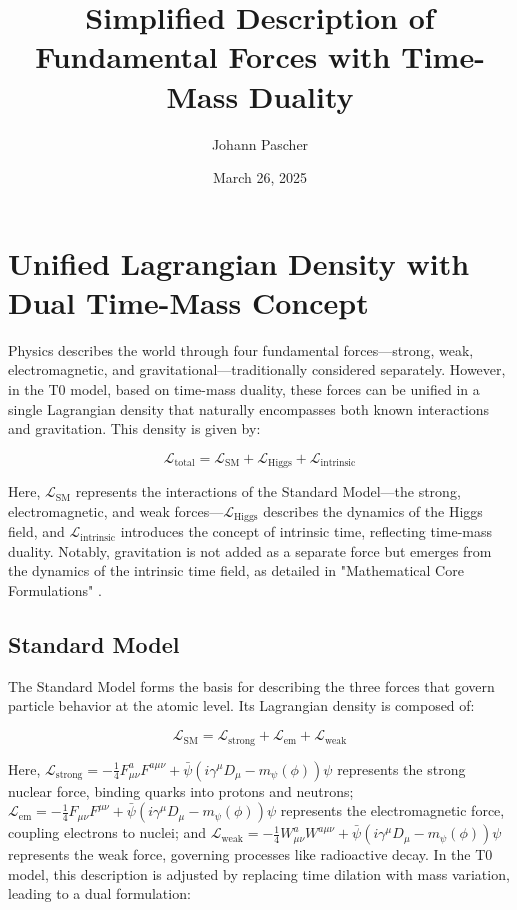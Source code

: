 \documentclass[a4paper,12pt]{article}
\title{Simplified Description of Fundamental Forces with Time-Mass Duality}
\author{Johann Pascher}
\date{March 26, 2025}
\begin{document}
	
	\maketitle
	
	\tableofcontents
	\newpage
	
	\section{Unified Lagrangian Density with Dual Time-Mass Concept}
	
	Physics describes the world through four fundamental forces—strong, weak, electromagnetic, and gravitational—traditionally considered separately. However, in the T0 model, based on time-mass duality, these forces can be unified in a single Lagrangian density that naturally encompasses both known interactions and gravitation. This density is given by:
	
	\begin{equation}
		\mathcal{L}_\text{total} = \mathcal{L}_\text{SM} + \mathcal{L}_\text{Higgs} + \mathcal{L}_\text{intrinsic}
	\end{equation}
	
	Here, \(\mathcal{L}_\text{SM}\) represents the interactions of the Standard Model—the strong, electromagnetic, and weak forces—\(\mathcal{L}_\text{Higgs}\) describes the dynamics of the Higgs field, and \(\mathcal{L}_\text{intrinsic}\) introduces the concept of intrinsic time, reflecting time-mass duality. Notably, gravitation is not added as a separate force but emerges from the dynamics of the intrinsic time field, as detailed in "Mathematical Core Formulations" \cite{pascher_lagrange_2025}.
	
	\subsection{Standard Model}
	
	The Standard Model forms the basis for describing the three forces that govern particle behavior at the atomic level. Its Lagrangian density is composed of:
	
	\begin{equation}
		\mathcal{L}_\text{SM} = \mathcal{L}_\text{strong} + \mathcal{L}_\text{em} + \mathcal{L}_\text{weak}
	\end{equation}
	
	Here, \(\mathcal{L}_\text{strong} = -\frac{1}{4} F_{\mu\nu}^a F^{a\mu\nu} + \bar{\psi}(i \gamma^\mu D_\mu - m_\psi(\phi))\psi\) represents the strong nuclear force, binding quarks into protons and neutrons; \(\mathcal{L}_\text{em} = -\frac{1}{4} F_{\mu\nu} F^{\mu\nu} + \bar{\psi}(i \gamma^\mu D_\mu - m_\psi(\phi))\psi\) represents the electromagnetic force, coupling electrons to nuclei; and \(\mathcal{L}_\text{weak} = -\frac{1}{4} W_{\mu\nu}^a W^{a\mu\nu} + \bar{\psi}(i \gamma^\mu D_\mu - m_\psi(\phi))\psi\) represents the weak force, governing processes like radioactive decay. In the T0 model, this description is adjusted by replacing time dilation with mass variation, leading to a dual formulation:
	
\end{document}
